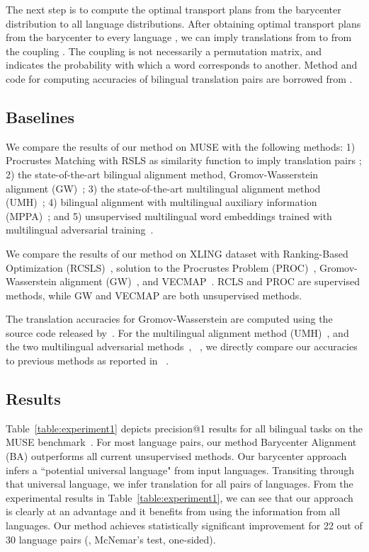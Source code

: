 \documentclass{article}
\begin{document}
The next step is to compute the optimal transport plans from the barycenter distribution to all language distributions. After obtaining optimal transport plans  from the barycenter to every language , we can imply translations from  to  from the coupling .
The coupling is not necessarily a permutation matrix, and indicates the probability with which a word corresponds to another. 
Method and code for computing accuracies of bilingual translation pairs are borrowed from \citet{AlvarezMelisJaakkola18}.

\subsection{Baselines} We compare the results of our method on MUSE with the following methods: 1) Procrustes Matching with RSLS as similarity function to imply translation pairs \cite{LampleCRDJ18};
2) the state-of-the-art bilingual alignment method, Gromov-Wasserstein alignment (GW)~\cite{AlvarezMelisJaakkola18}; 3) the state-of-the-art multilingual alignment method (UMH)~\cite{AlauxGCJ19}; 4) bilingual alignment with multilingual auxiliary information (MPPA)~\cite{TaitelbaumCG19a}; and 5) unsupervised multilingual word embeddings trained with multilingual adversarial training~\cite{ChenCardie18}.

We compare the results of our method on XLING dataset with Ranking-Based Optimization (RCSLS)~\cite{JoulinBMJG18},  solution to the Procrustes Problem (PROC)~\cite{ArtetxeLA18a,LampleCRDJ18,glavas-etal-2019-properly}, Gromov-Wasserstein alignment (GW)~\cite{AlvarezMelisJaakkola18}, and VECMAP~\cite{ArtetxeLA18a}. RCLS and PROC are supervised methods, while GW and VECMAP are both unsupervised methods. 

The translation accuracies for Gromov-Wasserstein are computed using the source code released by~\cite{AlvarezMelisJaakkola18}.
For the multilingual alignment method (UMH)~\cite{AlauxGCJ19}, and the two multilingual adversarial methods~\cite{ChenCardie18}, ~\cite{TaitelbaumCG19a},
we directly compare our accuracies to previous methods as reported in ~\cite{glavas-etal-2019-properly}.


\subsection{Results} Table~\ref{table:experiment1} depicts precision@1 results for all bilingual tasks on the MUSE benchmark~\cite{LampleCRDJ18}. For most language pairs, our method Barycenter Alignment (BA) outperforms all current unsupervised methods. Our barycenter approach infers a ``potential universal language" from input languages. Transiting through that universal language, we infer translation for all pairs of languages. From the experimental results in Table~\ref{table:experiment1}, we can see that our approach is clearly at an advantage and it benefits from using the information from all languages. Our method achieves statistically significant improvement for 22 out of 30 language pairs (, McNemar's test, one-sided).
\end{document}
